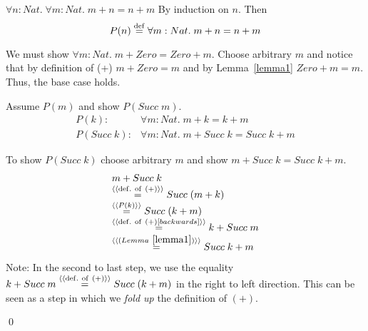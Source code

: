 \documentclass[11pt]{article}
\newcommand{\s}{{Succ\;}}
\begin{document}
\begin{theorem} $\forall{}n: Nat.\; \forall {} m: Nat .\; m + n = n + m $
\Proof By induction on $n$. Then \[P(n)\;{\stackrel{\rm def}{=}}\; \forall {} m: Nat .\; m + n = n + m \] 



\CASE[$P(Zero)$] We must show $\forall {} m: Nat .\; m + Zero = Zero + m
$. Choose arbitrary $m$ and notice that by definition of (+) $m + Zero = m$ and
by Lemma~\ref{lemma1} $Zero + m = m$.  Thus, the base case holds.



\CASE[$P(\s m)$] Assume $P(m)$ and show $P(\s m)$.
\[\begin{array}{rl}
P(k) :&  \forall {} m: Nat .\; m + k = k + m \\
P(\s k):&  \forall {} m: Nat .\; m + \s k = \s k + m  
\end{array}\]

To show $P(\s k)$ choose arbitrary $m$ and show $m + \s k = \s k + m$.
\[\begin{array}{l}
m + \s k \\
\byDef{(+)} \s (m + k)  \\
\byEq{P(k)} \s(k + m) \\
\byDef{(+)[backwards]} k + \s m  \\
\byEq{(Lemma~{\ref{lemma1}})} \s k + m\\
\end{array}\]
Note: In the second to last step, we use the equality $ k + \s m \byDef{(+)}
\s(k + m)$ in the right to left direction. This can be seen as a step in which
we {\em{fold up}} the definition of $(+)$.

\qed
\end{theorem}
\end{document}
